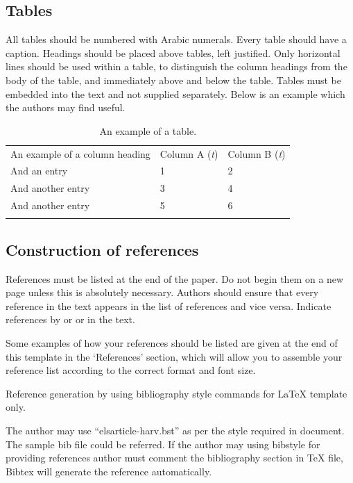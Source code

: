 \documentclass[5p,times,procedia]{elsarticle}
\begin{document}
\subsection{ Tables}

All tables should be numbered with Arabic numerals. Every table should have a caption. Headings should be placed above tables, left justified. Only horizontal lines should be used within a table, to distinguish the column headings from the body of the table, and immediately above and below the table. Tables must be embedded into the text and not supplied separately. Below is an example which the authors may find useful.

\begin{table}[h]
\caption{An example of a table.}
\begin{tabular*}{\hsize}{@{\extracolsep{\fill}}lll@{}}
\toprule
An example of a column heading & Column A ({\it{t}}) & Column B ({\it{t}})\\
\colrule
And an entry &   1 &  2\\
And another entry  & 3 &  4\\
And another entry &  5 &  6\\
\botrule
\end{tabular*}
\end{table}


\subsection{ Construction of references}

References must be listed at the end of the paper. Do not begin them on a new page unless this is absolutely necessary. Authors should ensure that every reference in the text appears in the list of references and vice versa. Indicate references by \cite{clark} or \cite{Deal} or \cite{Fachinger2006} in the text. 

Some examples of how your references should be listed are given at the end of this template in the `References' section, which will allow you to assemble your reference list according to the correct format and font size.

Reference generation by using bibliography style commands for LaTeX template only.

The author may use ``elsarticle-harv.bst'' as per the style required in document. The sample bib file could be referred. 
If the author may using bibstyle for providing references author must comment the bibliography section in TeX file, Bibtex will generate the reference automatically.
\end{document}
